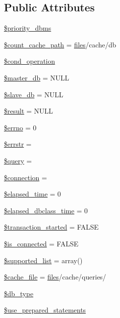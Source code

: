 \subsection*{Public Attributes}
\begin{DoxyCompactItemize}
\item 
\hyperlink{classDB_a082292b9ca3855cbddd3a74e9490ca82}{\$priority\+\_\+dbms}
\item 
\hyperlink{classDB_aca72b9b3a39bb5e5d2e444f20db2c6bb}{\$count\+\_\+cache\+\_\+path} = \textquotesingle{}\hyperlink{popup_8min_8js_a0742cac2750bccc2d88ac080fb9daa22}{files}/cache/db\textquotesingle{}
\item 
\hyperlink{classDB_a85f8f65c37474b0e65d844e1f01f39b0}{\$cond\+\_\+operation}
\item 
\hyperlink{classDB_ad0a3ae175a659516131cfc6cd615d15c}{\$master\+\_\+db} = N\+U\+LL
\item 
\hyperlink{classDB_a0a811a4446882ee9edf0ed846e8926f3}{\$slave\+\_\+db} = N\+U\+LL
\item 
\hyperlink{classDB_a74e74ee9d3311aa1e8107b8accd05e29}{\$result} = N\+U\+LL
\item 
\hyperlink{classDB_af99d759f7fb3bbadd579d72e686d1cf1}{\$errno} = 0
\item 
\hyperlink{classDB_ae006f35821aba99713b834fa6a69e55b}{\$errstr} = \textquotesingle{}\textquotesingle{}
\item 
\hyperlink{classDB_a32ebabea908efd805a83db48fec3ab52}{\$query} = \textquotesingle{}\textquotesingle{}
\item 
\hyperlink{classDB_ac9071e31f8241ad644430537f39a16ce}{\$connection} = \textquotesingle{}\textquotesingle{}
\item 
\hyperlink{classDB_af5a3fdd4e0078a185dac8c2727fb4f2c}{\$elapsed\+\_\+time} = 0
\item 
\hyperlink{classDB_a0483c1bfe18fa5e8bbe7915f9c8187a7}{\$elapsed\+\_\+dbclass\+\_\+time} = 0
\item 
\hyperlink{classDB_a39a0eef56f82082ca4c69bcad1f12a31}{\$transaction\+\_\+started} = F\+A\+L\+SE
\item 
\hyperlink{classDB_aac22b6ebcd8f78c2f70646d381f933dc}{\$is\+\_\+connected} = F\+A\+L\+SE
\item 
\hyperlink{classDB_ac09dd547a22963632e063c9ab68b7707}{\$supported\+\_\+list} = array()
\item 
\hyperlink{classDB_a9952a27cbf07942e5bb8853ab95b5bdb}{\$cache\+\_\+file} = \textquotesingle{}\hyperlink{popup_8min_8js_a0742cac2750bccc2d88ac080fb9daa22}{files}/cache/queries/\textquotesingle{}
\item 
\hyperlink{classDB_a78868b4c2301aa813d9e2d481424f1e8}{\$db\+\_\+type}
\item 
\hyperlink{classDB_a9902aee7d8900a597670fce92c7eb74b}{\$use\+\_\+prepared\+\_\+statements}
\end{DoxyCompactItemize}
